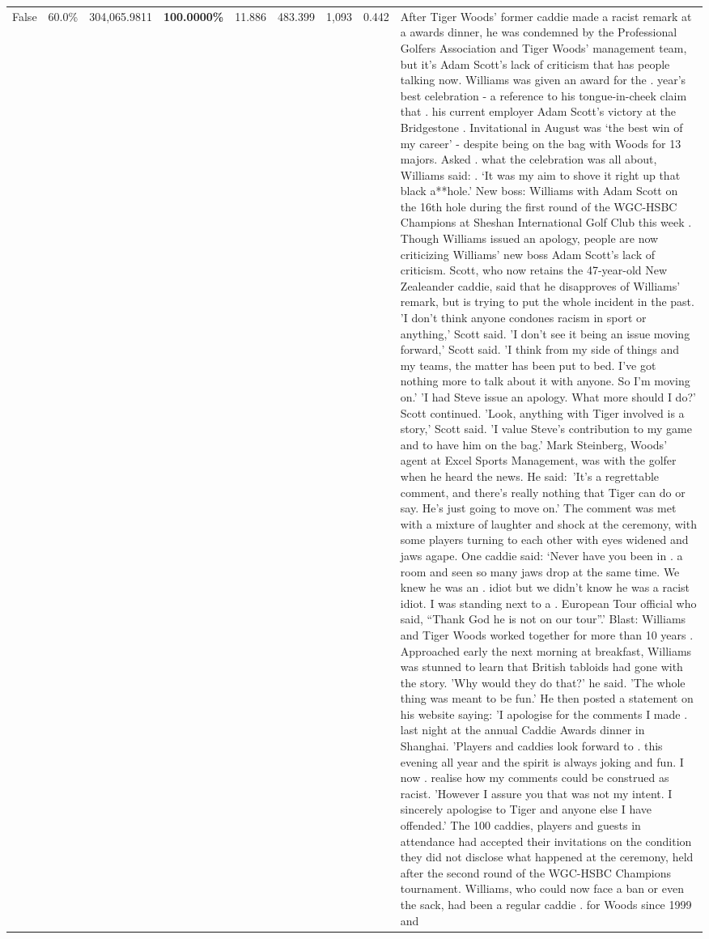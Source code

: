 \begin{table}[H]
\begin{tabular}{lllrlllll}
False & 60.0\% & 304,065.9811 & \bfseries \color{red} 100.0000\% & 11.886 & 483.399 & 1,093 & 0.442 & After Tiger Woods' former caddie made a racist remark at a awards dinner, he was condemned by the Professional Golfers Association and Tiger Woods' management team, but it's Adam Scott's lack of criticism that has people talking now. Williams was given an award for the . year’s best celebration - a reference to his tongue-in-cheek claim that . his current employer Adam Scott’s victory at the Bridgestone . Invitational in August was ‘the best win of my career’ - despite being on the bag with Woods for 13 majors. Asked . what the celebration was all about, Williams said: . ‘It was my aim to shove it right up that black a**hole.’ New boss: Williams with Adam Scott  on the 16th hole during the first round of the WGC-HSBC Champions at Sheshan International Golf Club this week . Though Williams issued an apology, people are now criticizing Williams' new boss Adam Scott's lack of criticism. Scott, who now retains the 47-year-old New Zealeander caddie, said that he disapproves of Williams' remark, but is trying to put the whole incident in the past. 'I don't think anyone condones racism in sport or anything,' Scott said. 'I don't see it being an issue moving forward,' Scott said. 'I think from my side of things and my teams, the matter has been put to bed. I've got nothing more to talk about it with anyone. So I'm moving on.' 'I had Steve issue an apology. What more should I do?' Scott continued. 'Look, anything with Tiger involved is a story,' Scott said. 'I value Steve's contribution to my game and to have him on the bag.' Mark Steinberg, Woods' agent at Excel Sports Management, was with the golfer when he heard the news. He said: 'It's a regrettable comment, and there's really nothing that Tiger can do or say. He's just going to move on.' The comment was met with a mixture of laughter and shock at the ceremony, with some players turning to each other with eyes widened and jaws agape. One caddie said: ‘Never have you been in . a room and seen so many jaws drop at the same time. We knew he was an . idiot but we didn’t know he was a racist idiot. I was standing next to a . European Tour official who said, “Thank God he is not on our tour”.’ Blast: Williams and Tiger Woods worked together for more than 10 years . Approached early the next morning at breakfast, Williams was stunned to learn that British tabloids had gone with the story. 'Why would they do that?' he said. 'The whole thing was meant to be fun.' He then posted a statement on his website saying: 'I apologise for the comments I made . last night at the annual Caddie Awards dinner in Shanghai. 'Players and caddies look forward to . this evening all year and the spirit is always joking and fun. I now . realise how my comments could be construed as racist. 'However I assure you that was not my intent. I sincerely apologise to Tiger and anyone else I have offended.' The 100 caddies, players and guests in attendance had accepted their invitations on the condition they did not disclose what happened at the ceremony, held after the second round of the WGC-HSBC Champions tournament. Williams, who could now face a ban or even the sack, had been a regular caddie . for Woods since 1999 and 
\end{tabular}
\end{table}
